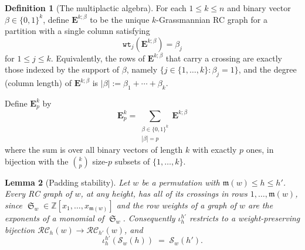 \documentclass{amsart}
\newtheorem{lemma}{Lemma}[subsection]
\theoremstyle{definition}
\newtheorem{definition}[lemma]{Definition}
\theoremstyle{remark}
\numberwithin{equation}{subsection}
\DeclareMathOperator{\sch}{\mathfrak{S}}
\newcommand{\wtt}{\mathtt{wt}}
\newcommand{\RC}{\mathcal{RC}}
\newcommand{\maxd}{\mathfrak{m}}
\begin{document}
\begin{definition}[The multiplactic algebra]
For each $1\leq k\leq n$ and binary vector $\beta\in\{0,1\}^k$, define $\mathbf{E}^{k;\beta}$ to be the unique $k$-Grassmannian RC graph for a partition with a single column satisfying
$$\wtt_j(\mathbf{E}^{k;\beta}) = \beta_j$$
for $1\leq j\leq k$. Equivalently, the rows of $\mathbf{E}^{k;\beta}$ that carry a crossing are exactly those indexed by the support of $\beta$, namely $\{j\in\{1,\ldots,k\}:\beta_j=1\}$, and the degree (column length) of $\mathbf{E}^{k;\beta}$ is $|\beta|:=\beta_1+\cdots+\beta_k$.

Define $\mathbf{E}_{p}^k$ by
$$\mathbf{E}_{p}^k = \sum_{\substack{\beta\in\{0,1\}^k\\ |\beta|=p}} \mathbf{E}^{k;\beta}$$
where the sum is over all binary vectors of length $k$ with exactly $p$ ones, in bijection with the $\binom{k}{p}$ size-$p$ subsets of $\{1,\ldots,k\}$.
\end{definition}

\begin{lemma}[Padding stability]\label{lemma:paddingstable}
Let $w$ be a permutation with $\maxd(w)\leq h\leq h'$. Every RC graph of $w$, at any height, has all of its crossings in rows $1,\ldots,\maxd(w)$, since $\sch_w\in\mathbb{Z}[x_1,\ldots,x_{\maxd(w)}]$ and the row weights of a graph of $w$ are the exponents of a monomial of $\sch_w$. Consequently $\iota_h^{h'}$ restricts to a weight-preserving bijection $\RC_h(w)\to\RC_{h'}(w)$, and
$$\iota_h^{h'}(\mathcal{S}_w(h))\;=\;\mathcal{S}_w(h').$$
\end{lemma}
\end{document}
